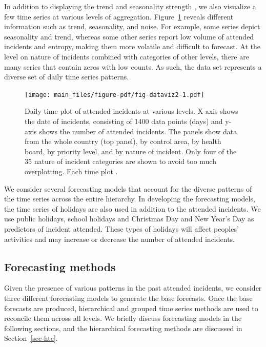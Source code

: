 \documentclass[
  authoryear,
  preprint,
  3p]{elsarticle}
\begin{document}
In addition to displaying the trend and seasonality strength
\citep{hyndman2021forecasting}, we also visualize a few time series at
various levels of aggregation. Figure~\ref{fig-dataviz2} reveals
different information such as trend, seasonality, and noise. For
example, some series depict seasonality and trend, whereas some other
series report low volume of attended incidents and entropy, making them
more volatile and difficult to forecast. At the level on nature of
incidents combined with categories of other levels, there are many
series that contain zeros with low counts. As such, the data set
represents a diverse set of daily time series patterns.

\begin{figure}

{\centering \texttt{[image: main\_files/figure-pdf/fig-dataviz2-1.pdf]}

}

\caption{\label{fig-dataviz2}Daily time plot of attended incidents at
various levels. X-axis shows the date of incidents, consisting of 1400
data points (days) and y-axis shows the number of attended incidents.
The panels show data from the whole country (top panel), by control
area, by health board, by priority level, and by nature of incident.
Only four of the 35 nature of incident categories are shown to avoid too
much overplotting. Each time plot .}

\end{figure}

We consider several forecasting models that account for the diverse
patterns of the time series across the entire hierarchy. In developing
the forecasting models, the time series of holidays are also used in
addition to the attended incidents. We use public holidays, school
holidays and Christmas Day and New Year's Day as predictors of incident
attended. These types of holidays will affect peoples' activities and
may increase or decrease the number of attended incidents.

\hypertarget{forecasting-methods}{%
\subsection{Forecasting methods}\label{forecasting-methods}}

Given the presence of various patterns in the past attended incidents,
we consider three different forecasting models to generate the base
forecasts. Once the base forecasts are produced, hierarchical and
grouped time series methods are used to reconcile them across all
levels. We briefly discuss forecasting models in the following sections,
and the hierarchical forecasting methods are discussed in
Section~\ref{sec-htc}.
\end{document}
